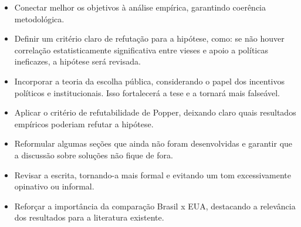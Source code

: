 \documentclass[
	article,
	12pt,
	oneside,
	a4paper,
	english,
	brazil,
	sumario=tradicional
]{abntex2}
\begin{document}
\begin{itemize}
  \item Conectar melhor os objetivos à análise empírica, garantindo coerência metodológica.
  \item Definir um critério claro de refutação para a hipótese, como: se não houver correlação estatisticamente significativa entre vieses e apoio a políticas ineficazes, a hipótese será revisada.
  \item Incorporar a teoria da escolha pública, considerando o papel dos incentivos políticos e institucionais. Isso fortalecerá a tese e a tornará mais falseável.
  \item Aplicar o critério de refutabilidade de Popper, deixando claro quais resultados empíricos poderiam refutar a hipótese.
  \item Reformular algumas seções que ainda não foram desenvolvidas e garantir que a discussão sobre soluções não fique de fora.
  \item Revisar a escrita, tornando-a mais formal e evitando um tom excessivamente opinativo ou informal.
  \item Reforçar a importância da comparação Brasil x EUA, destacando a relevância dos resultados para a literatura existente.
\end{itemize}
\newpage

\renewcommand{\refname}{Referências}


\end{document}
